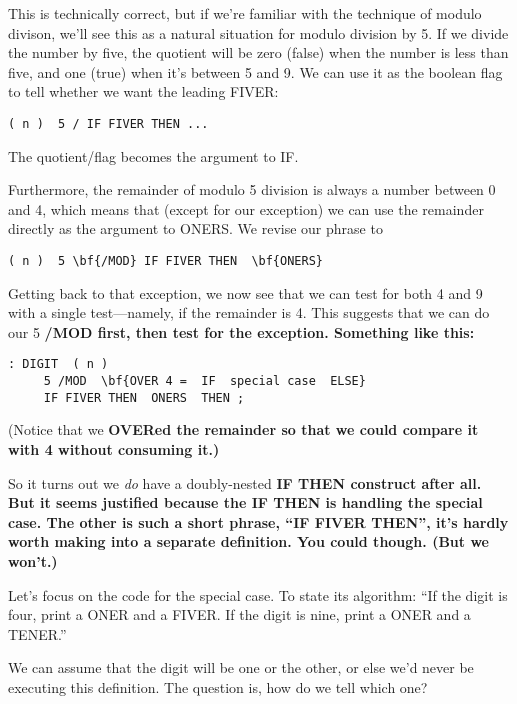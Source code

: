 This is technically correct, but if we're familiar with the technique of
modulo divison, we'll see this as a natural situation for modulo division
by 5. If we divide the number by five, the quotient will be zero (false)
when the number is less than five, and one (true) when it's between 5 and
9. We can use it as the boolean flag to tell whether we want the leading
FIVER:

\begin{verbatim}
( n )  5 / IF FIVER THEN ...
\end{verbatim}

The quotient/flag becomes the argument to IF.

Furthermore, the remainder of modulo 5 division is always a
number between 0 and 4, which means that (except for our exception) we
can use the remainder directly as the argument to ONERS. We revise our
phrase to

\begin{verbatim}
( n )  5 \bf{/MOD} IF FIVER THEN  \bf{ONERS}
\end{verbatim}

Getting back to that exception, we now see that we can test for both 4
and 9 with a single test---namely, if the remainder is 4. This suggests that
we can do our 5 \bf{/MOD} first, then test for the exception. Something like
this:

\begin{verbatim}
: DIGIT  ( n )
     5 /MOD  \bf{OVER 4 =  IF  special case  ELSE}
     IF FIVER THEN  ONERS  THEN ;
\end{verbatim}

(Notice that we \bf{OVER}ed the remainder so that we could compare it with
4 without consuming it.)

So it turns out we \emph{do} have a doubly-nested \bf{IF THEN} construct
after all. But it seems justified because the \bf{IF THEN} is handling the
special case. The other is such a short phrase, ``IF FIVER THEN'', it's
hardly worth making into a separate definition. You could though. (But we
won't.)

Let's focus on the code for the special case. To state its algorithm:
``If the digit is four, print a ONER and a FIVER. If the digit is nine, print
a ONER and a TENER.''

We can assume that the digit will be one or the other, or else we'd
never be executing this definition. The question is, how do we tell which
one?

